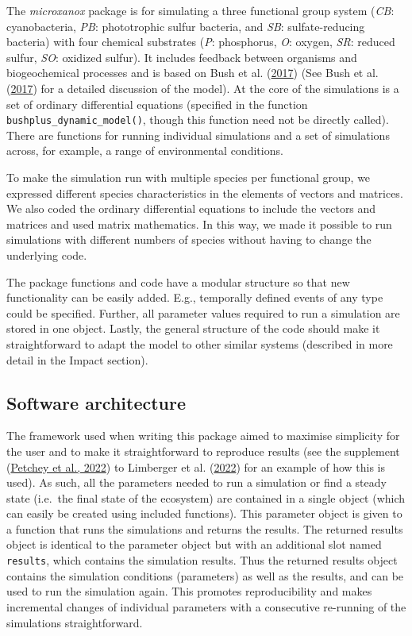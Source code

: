 \documentclass[
]{article}
\begin{document}
The \emph{microxanox} package is for simulating a three functional group
system (\emph{CB}: cyanobacteria, \emph{PB}: phototrophic sulfur
bacteria, and \emph{SB}: sulfate-reducing bacteria) with four chemical
substrates (\emph{P}: phosphorus, \emph{O}: oxygen, \emph{SR}: reduced
sulfur, \emph{SO}: oxidized sulfur). It includes feedback between
organisms and biogeochemical processes and is based on Bush et al.
(\protect\hyperlink{ref-Bush2017}{2017}) (See Bush et al.
(\protect\hyperlink{ref-Bush2017}{2017}) for a detailed discussion of
the model). At the core of the simulations is a set of ordinary
differential equations (specified in the function
\texttt{bushplus\_dynamic\_model()}, though this function need not be
directly called). There are functions for running individual simulations
and a set of simulations across, for example, a range of environmental
conditions.

To make the simulation run with multiple species per functional group,
we expressed different species characteristics in the elements of
vectors and matrices. We also coded the ordinary differential equations
to include the vectors and matrices and used matrix mathematics. In this
way, we made it possible to run simulations with different numbers of
species without having to change the underlying code.

The package functions and code have a modular structure so that new
functionality can be easily added. E.g., temporally defined events of
any type could be specified. Further, all parameter values required to
run a simulation are stored in one object. Lastly, the general structure
of the code should make it straightforward to adapt the model to other
similar systems (described in more detail in the Impact section).

\hypertarget{software-architecture}{%
\subsection{Software architecture}\label{software-architecture}}

The framework used when writing this package aimed to maximise
simplicity for the user and to make it straightforward to reproduce
results (see the supplement (\protect\hyperlink{ref-Petchey2022}{Petchey
et al., 2022}) to Limberger et al.
(\protect\hyperlink{ref-Limberger2022}{2022}) for an example of how this
is used). As such, all the parameters needed to run a simulation or find
a steady state (i.e.~the final state of the ecosystem) are contained in
a single object (which can easily be created using included functions).
This parameter object is given to a function that runs the simulations
and returns the results. The returned results object is identical to the
parameter object but with an additional slot named \texttt{results},
which contains the simulation results. Thus the returned results object
contains the simulation conditions (parameters) as well as the results,
and can be used to run the simulation again. This promotes
reproducibility and makes incremental changes of individual parameters
with a consecutive re-running of the simulations straightforward.
\end{document}
